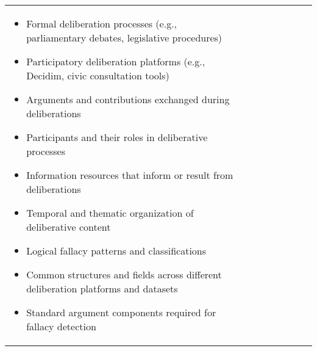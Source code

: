 \documentclass{article}
\begin{document}
\begin{table}
\begin{tabular}{| l | l | l | l  | l | l | l |l| }
{\begin{itemize}
\item Formal deliberation processes (e.g., parliamentary debates, legislative procedures)
\item Participatory deliberation platforms (e.g., Decidim, civic consultation tools)
\item Arguments and contributions exchanged during deliberations
\item Participants and their roles in deliberative processes
\item Information resources that inform or result from deliberations
\item Temporal and thematic organization of deliberative content
\item Logical fallacy patterns and classifications
\item Common structures and fields across different deliberation platforms and datasets
\item Standard argument components required for fallacy detection
\end{itemize}

}
\end{tabular}
\end{table}
\end{document}
